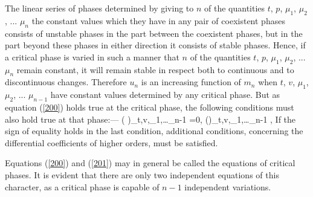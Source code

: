 \documentclass[12pt]{article}
\begin{document}
The linear series of phases determined by giving to $n$ of the quantities $t$, $p$, $\mu_1$, $\mu_2$, ... $\mu_n$ the constant values which they have in any pair of coexistent phases consists of unstable phases in the part between the coexistent phases, but in the part beyond these phases in either direction it consists of stable phases. Hence, if a critical phase is varied in such a manner that $n$ of the quantities $t$, $p$, $\mu_1$, $\mu_2$, ... $\mu_n$ remain constant, it will remain stable in respect both to continuous and to discontinuous changes. Therefore $u_n$ is an increasing function of $m_n$ when $t$, $v$, $\mu_1$, $\mu_2$, ... $\mu_{n-1}$ have constant values determined by any critical phase. But as equation (\ref{200}) holds true at the critical phase, the following conditions must also hold true at that phase:---
\eqs \left( \right)_{t,v,\mu_1,\dots \mu_{n-1}} =0,   
\label{201}\eqe
\eqs \left(\right)_{t,v,\mu_1,\dots \mu_{n-1}} , 
\label{202}\eqe
If the sign of equality holds in the last condition, additional conditions, concerning the differential coefficients of higher orders, must be satisfied. 


Equations (\ref{200}) and (\ref{201}) may in general be called the equations of critical phases. It is evident that there are only two independent equations of this character, as a critical phase is capable of $n - 1$ independent variations.
\end{document}
